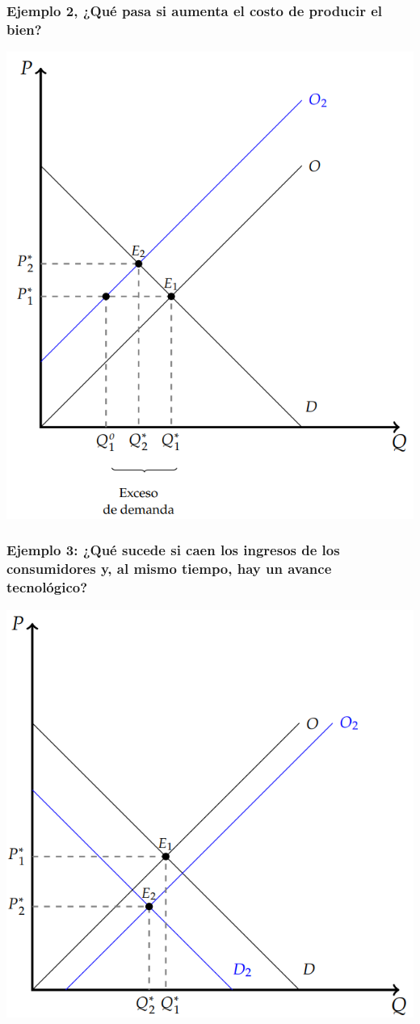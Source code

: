 \documentclass{beamer}
\begin{document}
\begin{frame}
\frametitle{Ejemplo 2, ¿Qué pasa si aumenta el costo de producir el bien?}
\centering
\includegraphics[scale=0.45]{../Figures/C15.7.png}
\end{frame}

\begin{frame}
\frametitle{Ejemplo 3: ¿Qué sucede si caen los ingresos de los consumidores y, al mismo tiempo, hay un avance tecnológico?}
\centering
\includegraphics[scale=0.5]{../Figures/C15.8.png}
\end{frame}
\end{document}
